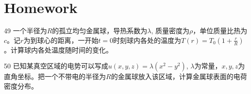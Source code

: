 \documentclass[CJK]{beamer}
\begin{document}
\section{Homework}

\begin{frame}
\bch
\bitem
\item[49]{一个半径为$R$的孤立均匀金属球，导热系数为$\lambda$, 质量密度为$\rho$，单位质量比热为$c$。记$r$为到球心的距离，一开始$t=0$时刻球内各处的温度为$T(r) = T_0\left(1+\frac{r}{R}\right)$。计算球内各处温度随时间的变化。}
\item[50]{已知某真空区域的电势可以写成$ u(x,y,z) = \lambda(x^2-y^2)$, $\lambda$为常量，$x,y,z$为直角坐标。把一个不带电的半径为$R$的金属球放入该区域，计算金属球表面的电荷密度分布。}
  
  \eitem
\ech
\end{frame}
\end{document}
